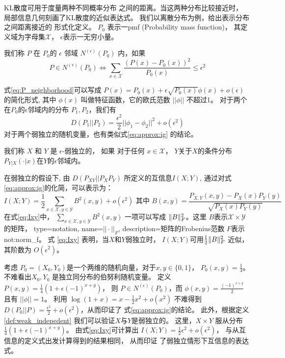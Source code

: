 KL散度可用于度量两种不同概率分布
之间的距离。当这两种分布比较接近时，
局部信息几何刻画了KL散度的近似表达式。
我们以离散分布为例，给出表示分布之间距离接近的
形式化定义。
$P_0$ 表示一\gls{pmf} (Probability mass function)，
其定义域为字母集$\mathcal{X}$，
$\epsilon$表示一无穷小量。
\begin{definition}\label{def:eps_neighborhood}
我们称 $P$ 在 $P_0$的 $\epsilon$ 邻域 $N^{(\epsilon)}(P_0)$ 内，如果
\begin{equation}\label{eq:P_neighborhood}
P \in N^{(\epsilon)}(P_0) \iff
\sum_{x \in \mathcal{X}} \frac{(P(x) - P_0(x))^2}{P_0(x)} \leq \epsilon^2
\end{equation}
\end{definition}
式\eqref{eq:P_neighborhood}可以写成 $P(x) = P_0(x) + \epsilon
\sqrt{P_0(x)} \phi(x) + o(\epsilon)$的简化形式, 其中 $\phi(x)$
叫做特征函数，它的欧氏范数 $||\phi || $ 不超过1。
对于两个在$P_0$的$\epsilon$邻域内的分布 $P_1, P_2$，我们有
\begin{equation}\label{eq:approx:ig}
D(P_1 || P_2) = \frac{\epsilon^2}{2} ||\phi_1 - \phi_2||^2 + o(\epsilon^2)
\end{equation}
对于两个弱独立的随机变量，也有类似式\eqref{eq:approx:ig}
的结论。
\begin{definition}\label{def:weak_indepedent}
我们称 $X$ 和 $Y$ 是 $\epsilon$-弱独立的，
如果 对于任何 $x \in \mathcal{X}$，
$Y$关于$X$的条件分布
$P_{Y|X}(\cdot |x)$在$Y$的$\epsilon$邻域内。
\end{definition}
在弱独立的假设下, 由 $D(P_{XY}||P_XP_Y)$ 所定义的互信息$I(X;Y)$, 
通过对式\eqref{eq:approx:ig}的化简，可以表示为：
\begin{equation}\label{eq:Ixy}
I(X;Y) = \frac{1}{2}\sum_{x\in \mathcal{X}, y\in \mathcal{Y}} B^2(x,y) + o(\epsilon^2)
\textrm{ 其中 }  B(x,y)=\frac{P_{X,Y}(x,y) - P_X(x) P_Y(y)}{\sqrt{P_X(x)P_Y(y)}}
\end{equation}
在式\eqref{eq:Ixy}中， $\sum_{x\in \mathcal{X}, y\in \mathcal{Y}} B^2(x,y)$
一项可以写成 $\lVert B\rVert_F^2$。这里 $B$表示$\mathcal{X} \times \mathcal{Y}$的矩阵，
{
  type=notation,
  name={$||\cdot||_F$},
  description={矩阵的Frobenius范数}
}
$F$表示\glsdesc{not:norm_f}。
式 \eqref{eq:Ixy} 表明，当$X$和$Y$弱独立时，
$I(X;Y)$可用$\frac{1}{2} \lVert B\rVert_F^2$
近似，其阶数为 $O(\epsilon^2)$。

\begin{example}\label{ex:Pweak_1}
考虑 $P_0=(X_0,Y_0)$是一个两维的随机向量，对于$x,y \in \{0,1\}$，
$P_0(x,y)=\frac{1}{4}$。
不难看出$X_0,Y_0$
是独立同分布的伯努利随机变量。
定义 $P(x,y)=\frac{1}{4}(1+\epsilon (-1)^{x+y})$，
则 $P\in N^{(\epsilon)}(P_0)$，而
$\phi(x,y) = \frac{(-1)^{x+y}}{2}$
且有 $||\phi||=1$。
利用 $\log(1+x) = x - \frac{1}{2}x^2 + o(x^2)$
不难得到 $D(P_0||P)=\frac{\epsilon^2}{2}
+o(\epsilon^2)$，从而印证了
式\eqref{eq:approx:ig}的结论。
此外，根据定义\ref{def:weak_indepedent}
我们可以验证$X$与$Y$是弱独立的。
这里，$X\times Y$ 服从分布$\frac{1}{4}(1+\epsilon (-1)^{x+y})$。
由式\eqref{eq:Ixy}可计算出
$I(X;Y)=\frac{1}{2}\epsilon^2+o(\epsilon^2)$，
与从互信息的定义式出发计算得到的结果相同，
从而印证
了弱独立情形下互信息的表达式。
\end{example}

